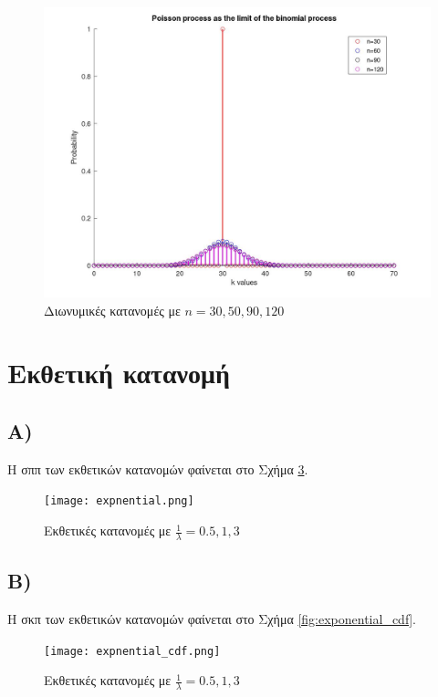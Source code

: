 \documentclass{article}
\begin{document}
\begin{figure}
    \centering
    \includegraphics[width=\textwidth]{binom_to_poisson.jpg}
    \caption{Διωνυμικές κατανομές με $n = {30, 50, 90, 120}$}
    \label{fig:binom_to_poisson}
\end{figure}

\section*{Εκθετική κατανομή}

\subsection*{Α)}

Η σππ των εκθετικών κατανομών φαίνεται στο Σχήμα \ref{fig:exponential}.

\begin{figure}
    \centering
    \texttt{[image: expnential.png]}
    \caption{Εκθετικές κατανομές με $\frac{1}{λ} = {0.5, 1, 3}$}
    \label{fig:exponential}
\end{figure}

\subsection*{Β)}

Η σκπ των εκθετικών κατανομών φαίνεται στο Σχήμα \ref{fig:exponential_cdf}.

\begin{figure}
    \centering
    \texttt{[image: expnential\_cdf.png]}
    \caption{Εκθετικές κατανομές με $\frac{1}{λ} = {0.5, 1, 3}$}
    \label{fig:exponential}
\end{figure}
\end{document}
